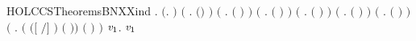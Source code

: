 \newcommand{\HOLCCSTheoremsBNXXdef}{\UseVerbatim{HOLCCSTheoremsBNXXdef}}
\begin{SaveVerbatim}{HOLCCSTheoremsBNXXind}
\HOLTokenTurnstile{} \HOLSymConst{\HOLTokenForall{}}. \ensuremath{(}\HOLSymConst{\HOLTokenForall{}}.   \ensuremath{)} \HOLSymConst{\HOLTokenConj{}} \ensuremath{(}\HOLSymConst{\HOLTokenForall{}}  .    \HOLSymConst{\HOLTokenImp{}}  \ensuremath{(}\HOLSymConst{\ensuremath{\ldotp}}\ensuremath{)} \ensuremath{)} \HOLSymConst{\HOLTokenConj{}}
       \ensuremath{(}\HOLSymConst{\HOLTokenForall{}}  .    \HOLSymConst{\HOLTokenConj{}}    \HOLSymConst{\HOLTokenImp{}}  \ensuremath{(} \HOLSymConst{\ensuremath{+}} \ensuremath{)} \ensuremath{)} \HOLSymConst{\HOLTokenConj{}}
       \ensuremath{(}\HOLSymConst{\HOLTokenForall{}}  .    \HOLSymConst{\HOLTokenConj{}}    \HOLSymConst{\HOLTokenImp{}}  \ensuremath{(} \HOLSymConst{\ensuremath{\mid}} \ensuremath{)} \ensuremath{)} \HOLSymConst{\HOLTokenConj{}}
       \ensuremath{(}\HOLSymConst{\HOLTokenForall{}}  .    \HOLSymConst{\HOLTokenImp{}}  \ensuremath{(}  \ensuremath{)} \ensuremath{)} \HOLSymConst{\HOLTokenConj{}}
       \ensuremath{(}\HOLSymConst{\HOLTokenForall{}}  .    \HOLSymConst{\HOLTokenImp{}}  \ensuremath{(}  \ensuremath{)} \ensuremath{)} \HOLSymConst{\HOLTokenConj{}}
       \ensuremath{(}\HOLSymConst{\HOLTokenForall{}} .  \ensuremath{(} \ensuremath{)} \ensuremath{)} \HOLSymConst{\HOLTokenConj{}}
       \ensuremath{(}\HOLSymConst{\HOLTokenForall{}}  .
          \ensuremath{(}   \HOLSymConst{\HOLTokenImp{}}  \ensuremath{(}\ensuremath{[}  \ensuremath{/}\ensuremath{]} \ensuremath{)} \ensuremath{(}  \ensuremath{)}\ensuremath{)} \HOLSymConst{\HOLTokenImp{}}
           \ensuremath{(}  \ensuremath{)} \ensuremath{)} \HOLSymConst{\HOLTokenImp{}}
       \HOLSymConst{\HOLTokenForall{}} \ensuremath{\HOLBoundVar{v}\sb{\mathrm{1}}}.   \ensuremath{\HOLBoundVar{v}\sb{\mathrm{1}}}
\end{SaveVerbatim}
